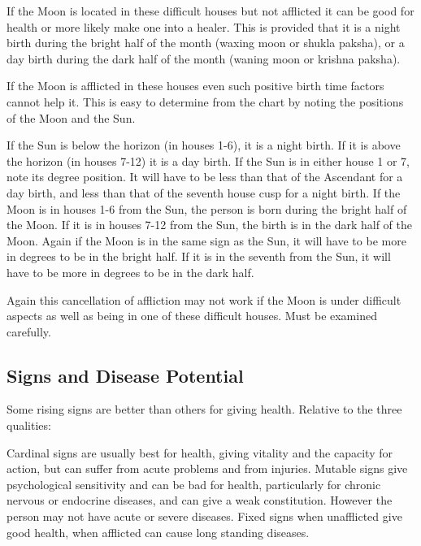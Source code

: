  

If the Moon is located in these difficult houses but not afflicted it can be good for health or more likely make one into a healer. This is provided that it is a night birth during the bright half of the month (waxing moon or shukla paksha), or a day birth during the dark half of the month (waning moon or krishna paksha).
 

If the Moon is afflicted in these houses even such positive birth time factors cannot help it. This is easy to determine from the chart by noting the positions of the Moon and the Sun.

 

If the Sun is below the horizon (in houses 1-6), it is a night birth. If it is above the horizon (in houses 7-12) it is a day birth. If the Sun is in either house 1 or 7, note its degree position. It will have to be less than that of the Ascendant for a day birth, and less than that of the seventh house cusp for a night birth.
If the Moon is in houses 1-6 from the Sun, the person is born during the bright half of the Moon. If it is in houses 7-12 from the Sun, the birth is in the dark half of the Moon. Again if the Moon is in the same sign as the Sun, it will have to be more in degrees to be in the bright half. If it is in the seventh from the Sun, it will have to be more in degrees to be in the dark half.
 

Again this cancellation of affliction may not work if the Moon is under difficult aspects as well as being in one of these difficult houses. Must be examined carefully.

 

\subsection{Signs and Disease Potential}
 

Some rising signs are better than others for giving health. Relative to the three qualities:

 

Cardinal signs are usually best for health, giving vitality and the capacity for action, but can suffer from acute problems and from injuries.
Mutable signs give psychological sensitivity and can be bad for health, particularly for chronic nervous or endocrine diseases, and can give a weak constitution. However the person may not have acute or severe diseases.
Fixed signs when unafflicted give good health, when afflicted can cause long standing diseases.
 

